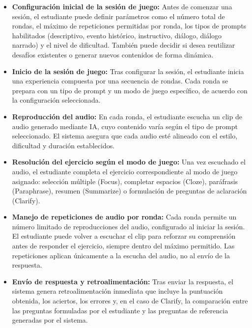 \begin{itemize}

\item \textbf{Configuración inicial de la sesión de juego:} Antes de comenzar una sesión, el estudiante puede definir parámetros como el número total de rondas, el máximo de repeticiones permitidas por ronda, los tipos de prompts habilitados (descriptivo, evento histórico, instructivo, diálogo, diálogo narrado) y el nivel de dificultad. También puede decidir si desea reutilizar desafíos existentes o generar nuevos contenidos de forma dinámica.

\item \textbf{Inicio de la sesión de juego:} Tras configurar la sesión, el estudiante inicia una experiencia compuesta por una secuencia de rondas. Cada ronda se prepara con un tipo de prompt y un modo de juego específico, de acuerdo con la configuración seleccionada.

\item \textbf{Reproducción del audio:} En cada ronda, el estudiante escucha un clip de audio generado mediante IA, cuyo contenido varía según el tipo de prompt seleccionado. El sistema asegura que cada audio esté alineado con el estilo, dificultad y duración establecidos.

\item \textbf{Resolución del ejercicio según el modo de juego:} Una vez escuchado el audio, el estudiante completa el ejercicio correspondiente al modo de juego asignado: selección múltiple (Focus), completar espacios (Cloze), paráfrasis (Paraphrase), resumen (Summarize) o formulación de preguntas de aclaración (Clarify).

\item \textbf{Manejo de repeticiones de audio por ronda:} Cada ronda permite un número limitado de reproducciones del audio, configurado al iniciar la sesión. El estudiante puede volver a escuchar el clip para reforzar su comprensión antes de responder el ejercicio, siempre dentro del máximo permitido. Las repeticiones aplican únicamente a la escucha del audio, no al envío de la respuesta.

\item \textbf{Envío de respuesta y retroalimentación:} Tras enviar la respuesta, el sistema genera retroalimentación inmediata que incluye la puntuación obtenida, los aciertos, los errores y, en el caso de Clarify, la comparación entre las preguntas formuladas por el estudiante y las preguntas de referencia generadas por el sistema.


\end{itemize}
